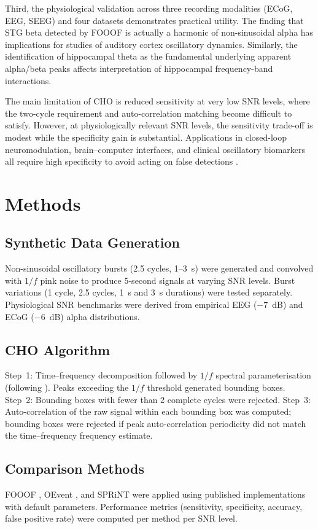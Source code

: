\documentclass[11pt]{article}
\begin{document}
Third, the physiological validation across three recording modalities (ECoG, EEG, SEEG) and four datasets demonstrates practical utility. The finding that STG beta detected by FOOOF is actually a harmonic of non-sinusoidal alpha has implications for studies of auditory cortex oscillatory dynamics. Similarly, the identification of hippocampal theta as the fundamental underlying apparent alpha/beta peaks affects interpretation of hippocampal frequency-band interactions.

The main limitation of CHO is reduced sensitivity at very low SNR levels, where the two-cycle requirement and auto-correlation matching become difficult to satisfy. However, at physiologically relevant SNR levels, the sensitivity trade-off is modest while the specificity gain is substantial. Applications in closed-loop neuromodulation, brain--computer interfaces, and clinical oscillatory biomarkers all require high specificity to avoid acting on false detections \citep{helfrich2016oscillatory, lachaux2012silencing}.

\section{Methods}

\subsection{Synthetic Data Generation}
Non-sinusoidal oscillatory bursts (2.5 cycles, 1--3~s) were generated and convolved with $1/f$ pink noise to produce 5-second signals at varying SNR levels. Burst variations (1 cycle, 2.5 cycles, 1~s and 3~s durations) were tested separately. Physiological SNR benchmarks were derived from empirical EEG ($-7$~dB) and ECoG ($-6$~dB) alpha distributions.

\subsection{CHO Algorithm}
Step~1: Time--frequency decomposition followed by $1/f$ spectral parameterisation (following \citealt{donoghue2020parameterizing}). Peaks exceeding the $1/f$ threshold generated bounding boxes. Step~2: Bounding boxes with fewer than 2 complete cycles were rejected. Step~3: Auto-correlation of the raw signal within each bounding box was computed; bounding boxes were rejected if peak auto-correlation periodicity did not match the time--frequency frequency estimate.

\subsection{Comparison Methods}
FOOOF \citep{donoghue2020parameterizing}, OEvent \citep{neymotin2022detecting}, and SPRiNT \citep{wilson2022sprint} were applied using published implementations with default parameters. Performance metrics (sensitivity, specificity, accuracy, false positive rate) were computed per method per SNR level.
\end{document}
